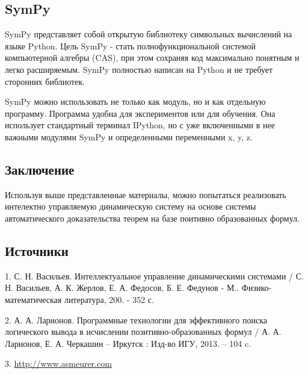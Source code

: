 \subsection*{SymPy}
SymPy представляет собой открытую библиотеку символьных вычислений на языке Python. Цель SymPy - стать полнофункциональной системой компьютерной алгебры (CAS), при этом сохраняя код максимально понятным и легко расширяемым. SymPy полностью написан на Python и не требует сторонних библиотек.

SymPy можно использовать не только как модуль, но и как отдельную программу. Программа удобна для экспериментов или для обучения. Она использует стандартный терминал IPython, но с уже включенными в нее важными модулями SymPy и определенными переменными x, y, z.

\subsection*{Заключение}

Используя выше представленные материалы, можно попытаться реализовать интелектно управляемую динамическую систему на основе системы автоматического доказательства теорем на базе поитивно образованных формул.


\subsection*{Источники}

1. С. Н. Васильев. Интеллектуальное управление динамическими системами / С. Н. Васильев, А. К. Жерлов, Е. А. Федосов, Б. Е. Федунов - М.. Физико-математическая литература, 200. - 352 с.

2. А. А. Ларионов. Программные технологии для эффективного поиска логического вывода в исчислении позитивно-образованных формул / А. А. Ларионов, Е. А. Черкашин – Иркутск : Изд-во ИГУ, 2013. – 104 c.

3. \url{http://www.asmeurer.com}

